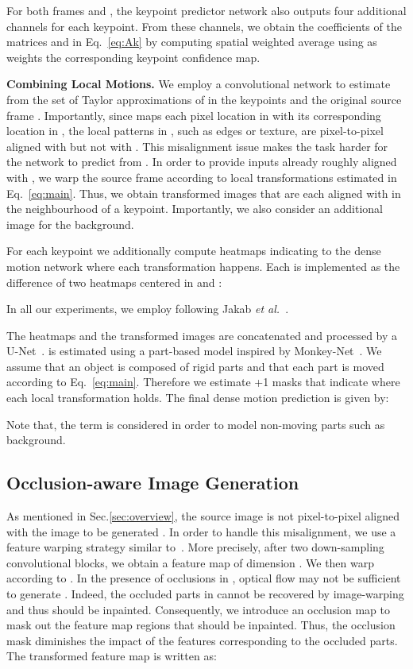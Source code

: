 \documentclass{article}
\def\etal{\textit{et al.}}
\begin{document}
For both frames  and , the keypoint predictor network also outputs four additional channels for each keypoint. From these channels, we obtain the coefficients of the matrices  and  in Eq.~\eqref{eq:Ak} by computing spatial weighted average using as weights the corresponding keypoint confidence map.

\textbf{Combining Local Motions.} We employ a convolutional network  to estimate  from the set of Taylor approximations of  in the keypoints and the original source frame .
Importantly, since  maps each pixel location in  with its corresponding location in , the local patterns in , such as edges or texture, are pixel-to-pixel aligned with  but not with . This misalignment issue makes the task harder for the network to predict  from . In order to provide inputs already roughly aligned with , we warp the source frame  according to local transformations estimated in Eq.~\eqref{eq:main}. Thus, we obtain  transformed images  that are each aligned with  in the neighbourhood of a keypoint. Importantly, we also consider an additional image  for the background.

For each keypoint  we additionally compute heatmaps  indicating to the dense motion network where each transformation happens. Each  is implemented as the difference of two heatmaps centered in  and :

In all our experiments, we employ 
following Jakab \etal~\cite{jakabunsupervised}.

The heatmaps  and the transformed images  are concatenated and processed by a U-Net~\cite{ronneberger2015u}.  is  estimated using a part-based model inspired by Monkey-Net~\cite{siarohin2018animating}. We assume that an object is composed of  rigid parts and that each part is moved according to Eq.~\eqref{eq:main}. Therefore we estimate +1 masks  that indicate where each local transformation holds. The final dense motion prediction   is given by: 

Note that, the term  is considered in order to model non-moving parts such as background.


\subsection{Occlusion-aware Image Generation}
As mentioned in Sec.\ref{sec:overview}, the source image  is not pixel-to-pixel aligned with the image to be generated . In order to handle this misalignment, we use a feature warping strategy similar to~\cite{siarohin2018deformable,siarohin2018animating,grigorev2019coordinate}. More precisely, after two down-sampling convolutional blocks, we obtain a feature map  of dimension . We then warp  according to . In the presence of occlusions in , optical flow may not be sufficient to generate . Indeed, the occluded parts in  cannot be recovered by image-warping and thus should be inpainted.
Consequently, we introduce an occlusion map  to mask out the feature map regions that should be inpainted. Thus, the occlusion mask diminishes the impact of the features corresponding to the occluded parts. The transformed feature map is written as:
\end{document}
